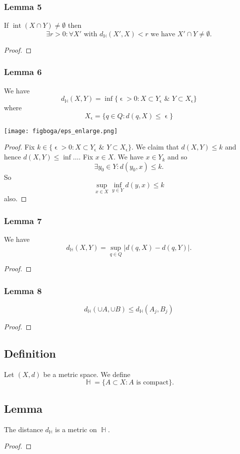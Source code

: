 \documentclass{article}
\DeclareMathOperator\eps{\epsilon}
\DeclareMathOperator\HH{\mathbb{H}}
\DeclareMathOperator\ite{int}
\begin{document}
\subsubsection*{Lemma 5}
If $\ite(X \cap Y) \neq \emptyset$ then $$
\exists r > 0: \forall X' \text{ with } d_{\HH}(X',X) < r \text{ we have } X' \cap Y \neq \emptyset.
$$
\begin{proof}
\end{proof}
\subsubsection*{Lemma 6}
We have $$
d_{\HH}(X,Y) = \inf \{ \eps > 0: X \subset Y_{\eps} \,\, \& \,\, Y \subset X_{\eps}  \}
$$
where $$
X_{\eps} = \{ q \in Q: d(q,X) \leq \eps  \}
$$
\begin{center}
\texttt{[image: figboga/eps\_enlarge.png]}
\end{center}
\begin{proof}
Fix $k \in  \{ \eps > 0: X \subset Y_{\eps} \,\, \& \,\, Y \subset X_{\eps}  \}$.
We claim that $d(X,Y) \leq k$ and hence $d(X,Y) \leq \inf \hdots$.
Fix $x \in X$. We have $x \in Y_k$ and so
$$
\exists y_0 \in Y: d(y_0,x) \leq k.
$$
So $$
\sup_{x \in X} \inf_{y \in Y} d(y,x) \leq k
$$
also.
\end{proof}
\subsubsection*{Lemma 7}
We have $$
d_{\HH}(X,Y) = \sup_{q \in Q} \left |   d(q,X) - d(q,Y)         \right |.
$$
\begin{proof}
\end{proof}
\subsubsection*{Lemma 8}
$$
d_{\HH}(\cup A, \cup B) \leq d_{\HH}(A_j,B_j)
$$
\begin{proof}
\end{proof}
\subsection*{Definition}
Let $(X,d)$ be a metric space. We define $$
\HH = \{ A \subset X: A \text{ is compact} \}.
$$
\subsection*{Lemma}
The distance $d_{\HH}$ is a metric on $\HH$.
\begin{proof}
\end{proof}
\end{document}
